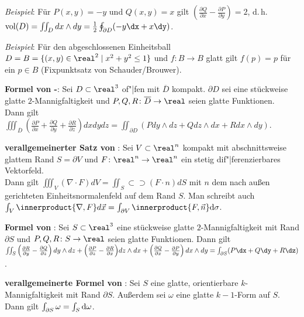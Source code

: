 \emph{Beispiel}:
Für $P(x, y) = -y$ und $Q(x, y) = x$ gilt
$\left(\frac{\partial Q}{\partial x} -
\frac{\partial P}{\partial y}\right) = 2$, d.\,h. \\
$\vol(D) =  \iint_D dx \land dy =
\frac{1}{2} \oint_{\partial D} (-y\dx + x\dy)$.

\emph{Beispiel}:
Für den abgeschlossenen Einheitsball
$D = B = \{(x, y) \in \real^2 \;|\; x^2 + y^2 \le 1\}$ und
$f\colon B \rightarrow B$ glatt gilt
$f(p) = p$ für ein $p \in B$
(Fixpunktsatz von Schauder/Brouwer).

\linie

\textbf{Formel von -}:
Sei $D \subset \real^3$ of"|fen mit $\overline{D}$ kompakt.
$\partial D$ sei eine stückweise glatte $2$-Mannigfaltigkeit und
$P, Q, R\colon \overline{D} \rightarrow \real$ seien glatte Funktionen. \\
Dann gilt $\iiint_{\overline{D}} \left(\frac{\partial P}{\partial x} +
\frac{\partial Q}{\partial y} + \frac{\partial R}{\partial z}\right) dxdydz =
\iint_{\partial D} (Pdy \land dz + Qdz \land dx + Rdx \land dy)$.

\textbf{verallgemeinerter Satz von }:
Sei $V \subset \real^n$ kompakt mit
abschnittsweise glattem Rand $S = \partial V$
und $F\colon \real^n \rightarrow \real^n$ ein stetig dif"|ferenzierbares
Vektorfeld. \\
Dann gilt $\iiint_V (\nabla \cdot F) dV =
\iint_S\!\!\!\!\!\!\!\!\!\!\!\subset\!\supset (F \cdot n) dS$
mit $n$ dem nach außen gerichteten Einheitsnormalenfeld auf dem Rand $S$.
Man schreibt auch $\int_V \innerproduct{\nabla, F} d\vec{x} =
\int_{\partial V} \innerproduct{F, \vec{n}} \d\sigma$.

\linie

\textbf{Formel von }:
Sei $S \subset \real^3$ eine stückweise glatte $2$-Mannigfaltigkeit mit Rand
$\partial S$ und $P, Q, R\colon S \rightarrow \real$ seien glatte Funktionen.
Dann gilt \\
$\iint_S \left(\frac{\partial R}{\partial y} -
\frac{\partial Q}{\partial z}\right) dy \land dz +
\Big(\frac{\partial P}{\partial z} -
\frac{\partial R}{\partial x}\Big) dz \land dx +
\left(\frac{\partial Q}{\partial x} -
\frac{\partial P}{\partial y}\right) dx \land dy =
\int_{\partial S} (P\dx + Q\dy + R\dz)$.

\textbf{verallgemeinerte Formel von }:
Sei $S$ eine glatte, orientierbare $k$-Mannigfaltigkeit mit Rand $\partial S$.
Außerdem sei $\omega$ eine glatte $k - 1$-Form auf $S$. \\
Dann gilt $\int_{\partial S} \omega = \int_S \mathrm{d} \omega$.

